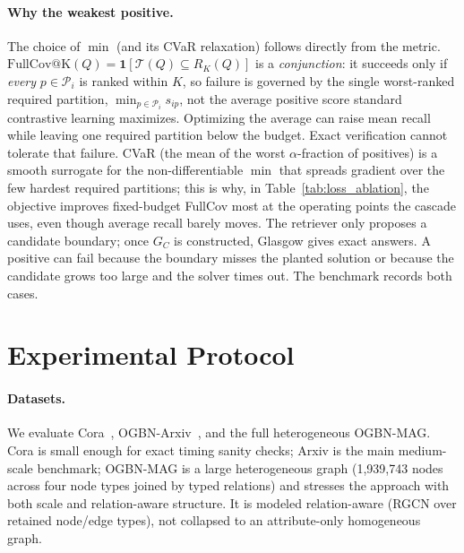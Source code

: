 \documentclass{article}
\begin{document}
\paragraph{Why the weakest positive.}
The choice of $\min$ (and its CVaR relaxation) follows directly from the metric. $\mathrm{FullCov@K}(Q)=\mathbf{1}[\mathcal{T}(Q)\subseteq R_K(Q)]$ is a \emph{conjunction}: it succeeds only if \emph{every} $p\in\mathcal{P}_i$ is ranked within $K$, so failure is governed by the single worst-ranked required partition, $\min_{p\in\mathcal{P}_i} s_{ip}$, not the average positive score standard contrastive learning maximizes. Optimizing the average can raise mean recall while leaving one required partition below the budget. Exact verification cannot tolerate that failure. CVaR (the mean of the worst $\alpha$-fraction of positives) is a smooth surrogate for the non-differentiable $\min$ that spreads gradient over the few hardest required partitions; this is why, in Table~\ref{tab:loss_ablation}, the objective improves fixed-budget FullCov most at the operating points the cascade uses, even though average recall barely moves. The retriever only proposes a candidate boundary; once $G_C$ is constructed, Glasgow gives exact answers. A positive can fail because the boundary misses the planted solution or because the candidate grows too large and the solver times out. The benchmark records both cases.

\section{Experimental Protocol}

\paragraph{Datasets.}
We evaluate Cora~\cite{ref_cora}, OGBN-Arxiv~\cite{ref_ogb}, and the full heterogeneous OGBN-MAG. Cora is small enough for exact timing sanity checks; Arxiv is the main medium-scale benchmark; OGBN-MAG is a large heterogeneous graph (1{,}939{,}743 nodes across four node types joined by typed relations) and stresses the approach with both scale and relation-aware structure. It is modeled relation-aware (RGCN over retained node/edge types), not collapsed to an attribute-only homogeneous graph.
\end{document}
